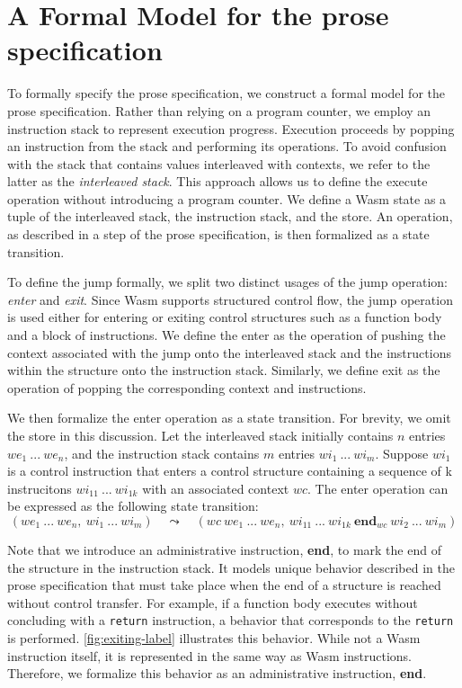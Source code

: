 \section{A Formal Model for the prose specification}
\label{sec:model}


To formally specify the prose specification, we construct a formal model for
the prose specification.
Rather than relying on a program counter, we employ an instruction stack to
represent execution progress.
Execution proceeds by popping an instruction from the stack and performing its
operations.
To avoid confusion with the stack that contains values interleaved with
contexts, we refer to the latter as the \textit{interleaved stack}.
This approach allows us to define the execute operation without introducing a
program counter.
We define a Wasm state as a tuple of the interleaved stack, the instruction
stack, and the store.
An operation, as described in a step of the prose specification, is then
formalized as a state transition.


To define the jump formally, we split two distinct usages of the jump
operation: \textit{enter} and \textit{exit}.
Since Wasm supports structured control flow, the jump operation is used either
for entering or exiting control structures such as a function body and a block
of instructions.
We define the enter as the operation of pushing the context associated with the
jump onto the interleaved stack and the instructions within the structure onto
the instruction stack.
Similarly, we define exit as the operation of popping the corresponding context
and instructions.


We then formalize the enter operation as a state transition.
For brevity, we omit the store in this discussion.
Let the interleaved stack initially contains $n$ entries $we_1 ~ ... ~ we_n$,
and the instruction stack contains $m$ entries $wi_1 ~ ... ~ wi_m$.
Suppose $wi_1$ is a control instruction that enters a control structure
containing a sequence of k instrucitons $wi_{11} ~ ... ~ wi_{1k}$ with an
associated context $wc$.
The enter operation can be expressed as the following state transition:
\[
(we_1 ~ ... ~ we_n, ~ wi_1 ~ ... ~ wi_m) \quad\leadsto\quad
  (
    wc ~ we_1 ~ ...  ~ we_n, ~
    wi_{11} ~ ... ~ wi_{1k} ~ \textbf{end}_{wc} ~ wi_2 ~ ... ~ wi_m
  )
\]


Note that we introduce an administrative instruction, \textbf{end}, to mark the
end of the structure in the instruction stack.
It models unique behavior described in the prose specification that must take
place when the end of a structure is reached without control transfer.
For example, if a function body executes without concluding with a
\texttt{return} instruction, a behavior that corresponds to the \texttt{return}
is performed.
\cref{fig:exiting-label} illustrates this behavior.
While not a Wasm instruction itself, it is represented in the same way as Wasm
instructions.
Therefore, we formalize this behavior as an administrative instruction,
\textbf{end}.


